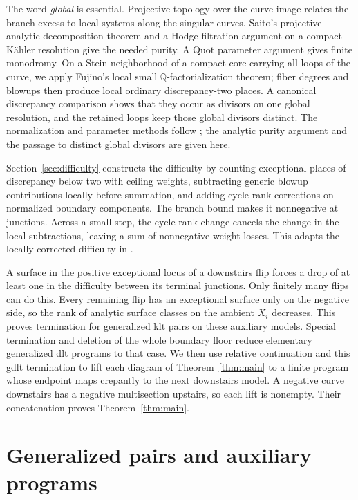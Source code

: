 \documentclass[11pt]{amsart}
\theoremstyle{definition}
\theoremstyle{remark}
\numberwithin{equation}{section}
\newcommand{\Q}{\mathbb{Q}}
\begin{document}
The word \emph{global} is essential. Projective topology over the curve image relates the branch excess to local systems along the singular curves. Saito's projective analytic decomposition theorem and a Hodge-filtration argument on a compact K\"ahler resolution give the needed purity. A Quot parameter argument gives finite monodromy. On a Stein neighborhood of a compact core carrying all loops of the curve, we apply Fujino's local small \(\Q\)-factorialization theorem; fiber degrees and blowups then produce local ordinary discrepancy-two places. A canonical discrepancy comparison shows that they occur as divisors on one global resolution, and the retained loops keep those global divisors distinct. The normalization and parameter methods follow \cite[Sections~5--6]{ProjectiveLCFourfolds}; the analytic purity argument and the passage to distinct global divisors are given here.

Section~\ref{sec:difficulty} constructs the difficulty by counting exceptional places of discrepancy below two with ceiling weights, subtracting generic blowup contributions locally before summation, and adding cycle-rank corrections on normalized boundary components. The branch bound makes it nonnegative at junctions. Across a small step, the cycle-rank change cancels the change in the local subtractions, leaving a sum of nonnegative weight losses. This adapts the locally corrected difficulty in \cite[Section~4]{ProjectiveLCFourfolds}.

A surface in the positive exceptional locus of a downstairs flip forces a drop of at least one in the difficulty between its terminal junctions. Only finitely many flips can do this. Every remaining flip has an exceptional surface only on the negative side, so the rank of analytic surface classes on the ambient \(X_i\) decreases. This proves termination for generalized klt pairs on these auxiliary models. Special termination and deletion of the whole boundary floor reduce elementary generalized dlt programs to that case. We then use relative continuation and this gdlt termination to lift each diagram of Theorem~\ref{thm:main} to a finite program whose endpoint maps crepantly to the next downstairs model. A negative curve downstairs has a negative multisection upstairs, so each lift is nonempty. Their concatenation proves Theorem~\ref{thm:main}.

\section{Generalized pairs and auxiliary programs}\label{sec:preliminaries}
\end{document}
